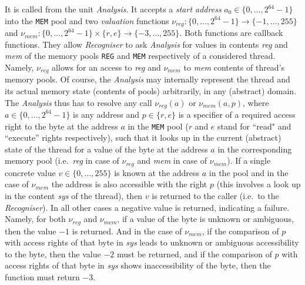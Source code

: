 \documentclass[10pt,twocolumn]{article}
\begin{document}
It is called from the unit \emph{Analysis}. It accepts a \emph{start address} $
a_0 \in \{0,\ldots,2^{64}-1\} $ into the \texttt{MEM} pool and two
\emph{valuation} functions $ \nu_\mathit{reg}: \{0,\ldots,2^{64}-1\} \rightarrow
\{-1,\ldots,255\} $ and $ \nu_\mathit{mem}: \{0,\ldots,2^{64}-1\} \times \{ r,e
\} \rightarrow \{-3,\ldots,255\} $. Both functions are callback functions. They
allow \emph{Recogniser} to ask \emph{Analysis} for values in contents
\textit{reg} and \textit{mem} of the memory pools \texttt{REG} and \texttt{MEM}
respectively of a considered thread. Namely, $ \nu_\mathit{reg} $ allows for an
access to \textit{reg} and $ \nu_\mathit{mem} $ to \textit{mem} contents of
thread's memory pools. Of course, the \emph{Analysis} may internally represent
the thread and its actual memory state (contents of pools) arbitrarily, in any
(abstract) domain. The \emph{Analysis} thus has to resolve any call $
\nu_\mathit{reg}(a) $ or $ \nu_\mathit{mem}(a,p) $, where $ a \in
\{0,\ldots,2^{64}-1\} $ is any address and $ p \in \{ r,e \} $ is a specifier of
a required access right to the byte at the address $ a $ in the \texttt{MEM}
pool ($ r $ and $ e $ stand for ``read" and ``execute'' rights respectively),
such that it looks up in the current (abstract) state of the thread for a value
of the byte at the address $ a $ in the corresponding memory pool
(i.e.~\textit{reg} in case of $ \nu_\mathit{reg} $ and \textit{mem} in case of $
\nu_\mathit{mem} $). If a single concrete value $ v \in \{0,\ldots,255\} $ is
known at the address $ a $ in the pool and in the case of $ \nu_\mathit{mem} $
the address is also accessible with the right $ p $ (this involves a look up in
the content \textit{sys} of the thread), then $ v $ is returned to the caller
(i.e.~to the \emph{Recogniser}). In all other cases a negative value is
returned, indicating a failure. Namely, for both $ \nu_\mathit{reg} $ and $
\nu_\mathit{mem} $, if a value of the byte is unknown or ambiguous, then the
value $ -1 $ is returned. And in the case of $ \nu_\mathit{mem} $, if the
comparison of $ p $ with access rights of that byte in \textit{sys} leads to
unknown or ambiguous accessibility to the byte, then the value $ -2 $ must be
returned, and if the comparison of $ p $ with access rights of that byte in
\textit{sys} shows inaccessibility of the byte, then the function must return $
-3 $.
\end{document}
